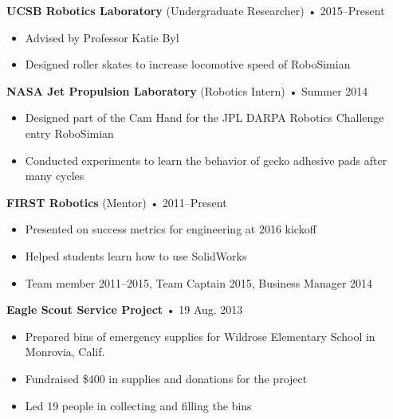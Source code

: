 \documentclass[12pt, oneside]{article}
\newcommand{\jobtitle}[3] {
	{\bf #1} {#2} • {#3} \vspace{-10pt} \\
}
\begin{document}
\begin{flushleft}
\jobtitle{UCSB Robotics Laboratory}{(Undergraduate Researcher)}{2015–Present}
\begin{itemize}
	\item Advised by Professor Katie Byl
	\item Designed roller skates to increase locomotive speed of RoboSimian
\end{itemize}

\jobtitle{NASA Jet Propulsion Laboratory}{(Robotics Intern)}{Summer 2014}
\begin{itemize}
	\item Designed part of the Cam Hand for the JPL DARPA Robotics Challenge entry RoboSimian
	\item Conducted experiments to learn the behavior of gecko adhesive pads after many cycles
\end{itemize}

\jobtitle{FIRST Robotics}{(Mentor)}{2011–Present}
\begin{itemize}
	\item Presented on success metrics for engineering at 2016 kickoff
	\item Helped students learn how to use SolidWorks
	\item Team member 2011–2015, Team Captain 2015, Business Manager 2014
\end{itemize}

\jobtitle{Eagle Scout Service Project}{}{19 Aug. 2013}
\begin{itemize}
	\item Prepared bins of emergency supplies for Wildrose Elementary School in Monrovia, Calif.
	\item Fundraised \$400 in supplies and donations for the project
	\item Led 19 people in collecting and filling the bins
\end{itemize}%


\end{flushleft}
\end{document}
